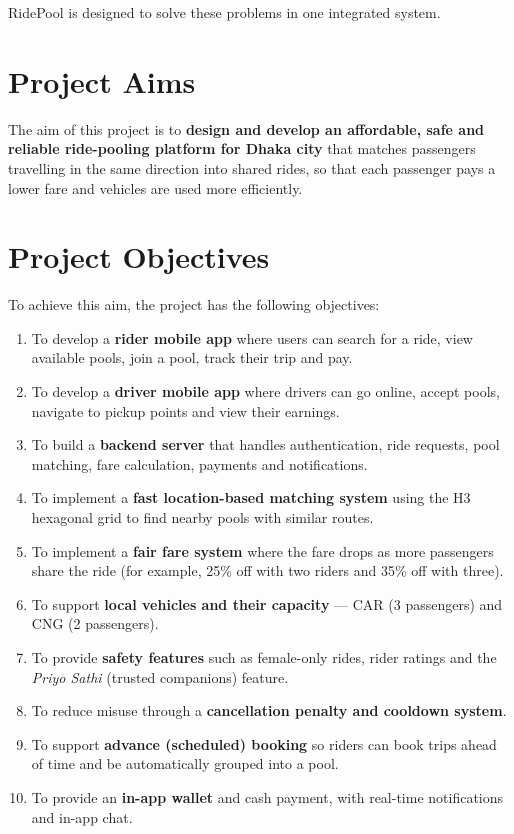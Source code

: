 RidePool is designed to solve these problems in one integrated system.

\section{Project Aims}
\label{sec:aims}

The aim of this project is to \textbf{design and develop an affordable, safe
and reliable ride-pooling platform for Dhaka city} that matches passengers
travelling in the same direction into shared rides, so that each passenger pays
a lower fare and vehicles are used more efficiently.

\section{Project Objectives}
\label{sec:objectives}

To achieve this aim, the project has the following objectives:

\begin{enumerate}
  \item To develop a \textbf{rider mobile app} where users can search for a
        ride, view available pools, join a pool, track their trip and pay.
  \item To develop a \textbf{driver mobile app} where drivers can go online,
        accept pools, navigate to pickup points and view their earnings.
  \item To build a \textbf{backend server} that handles authentication, ride
        requests, pool matching, fare calculation, payments and notifications.
  \item To implement a \textbf{fast location-based matching system} using the
        H3 hexagonal grid to find nearby pools with similar routes.
  \item To implement a \textbf{fair fare system} where the fare drops as more
        passengers share the ride (for example, 25\% off with two riders and
        35\% off with three).
  \item To support \textbf{local vehicles and their capacity} --- CAR
        (3 passengers) and CNG (2 passengers).
  \item To provide \textbf{safety features} such as female-only rides, rider
        ratings and the \textit{Priyo Sathi} (trusted companions) feature.
  \item To reduce misuse through a \textbf{cancellation penalty and cooldown
        system}.
  \item To support \textbf{advance (scheduled) booking} so riders can book
        trips ahead of time and be automatically grouped into a pool.
  \item To provide an \textbf{in-app wallet} and cash payment, with real-time
        notifications and in-app chat.
\end{enumerate}

